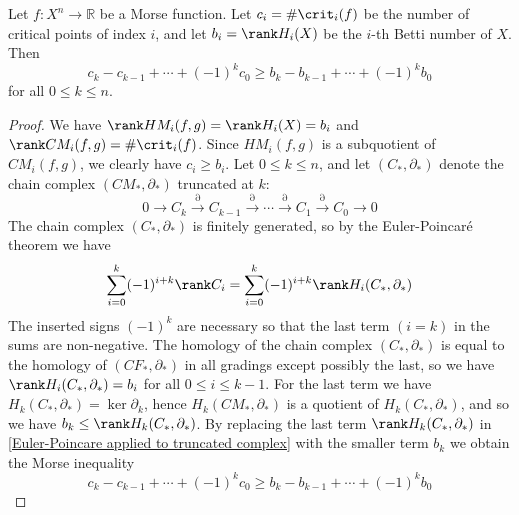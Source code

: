 \begin{thm}
\label{Morse inequalities}
Let $f : X^n \rightarrow \mathbb R$ be a Morse function. Let $c_i = \# \crit_i(f)$ be the number of critical points of index $i$, and let $b_i = \rank H_i(X)$ be the $i$-th Betti number of $X$. Then
\begin{equation}
\label{Morse inequality}
c_k - c_{k-1} + \cdots + (-1)^k c_0 \geq b_k - b_{k-1} + \cdots + (-1)^k b_0
\end{equation}
for all $0 \leq k \leq n$.
\end{thm}
\begin{proof}
We have $\rank HM_i(f,g) = \rank H_i(X) = b_i$ and $\rank CM_i(f,g) = \# \crit_i(f)$. Since $HM_i(f,g)$ is a subquotient of $CM_i(f,g)$, we clearly have $c_i \geq b_i$.  Let $0 \leq k \leq n$, and let $(C_*,\partial_*)$ denote the chain complex $(CM_*,\partial_*)$ truncated at $k$:
\[ 0 \longrightarrow C_k \stackrel{\partial}{\longrightarrow} C_{k-1} \stackrel{\partial}{\longrightarrow} \cdots \stackrel{\partial}{\longrightarrow} C_1 \stackrel{\partial}{\longrightarrow} C_0 \longrightarrow 0 \]
The chain complex $(C_*,\partial_*)$ is finitely generated, so by the Euler-Poincar\'{e} theorem we have
\begin{equation}
\label{Euler-Poincare applied to truncated complex}
\sum_{i=0}^k (-1)^{i+k} \rank C_i = \sum_{i=0}^k (-1)^{i+k} \rank H_i(C_*,\partial_*)
\end{equation}
The inserted signs $(-1)^k$ are necessary so that the last term $(i=k)$ in the sums are non-negative. The homology of the chain complex $(C_*,\partial_*)$ is equal to the homology of $(CF_*,\partial_*)$ in all gradings except possibly the last, so we have $\rank H_i(C_*,\partial_*)=b_i$ for all $0 \leq i \leq k-1$. For the last term we have $H_k(C_*,\partial_*)=\ker \partial_k$, hence $H_k(CM_*,\partial_*)$ is a quotient of $H_k(C_*,\partial_*)$, and so we have $b_k \leq \rank H_k(C_*,\partial_*)$. By replacing the last term $\rank H_k(C_*,\partial_*)$ in \eqref{Euler-Poincare applied to truncated complex} with the smaller term $b_k$ we obtain the Morse inequality
\[ c_k - c_{k-1} + \cdots + (-1)^k c_0 \geq b_k - b_{k-1} + \cdots + (-1)^k b_0 \]
\end{proof}






